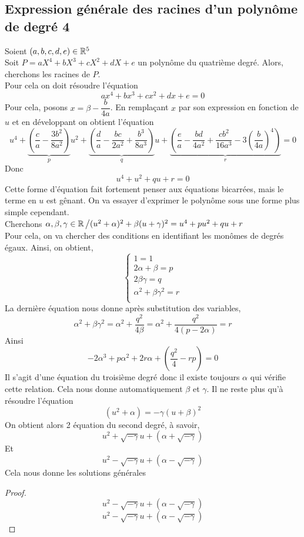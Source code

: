 \documentclass[mathmodern,openany,11pt]{livre}
\begin{document}
\subsection{Expression générale des racines d'un polynôme de degré 4}
Soient $(a,b,c,d,e)\in\mathbb{R}^5$\\
Soit $P = aX^4+bX^3+cX^2+dX+e$ un polynôme du quatrième degré. Alors, cherchons les racines de $P$.\\ 
Pour cela on doit résoudre l'équation 
\[ax^4+bx^3+cx^2+dx+e=0\]
Pour cela, posons $x = \beta - \dfrac{b}{4a}$. En remplaçant $x$ par son expression en fonction de $u$ et en développant on obtient l'équation
\[
u^4+\underbrace{\left(\dfrac{c}{a}-\dfrac{3b^2}{8a^2}\right)}_{p}u^2 + \underbrace{\left(\dfrac{d}{a}-\dfrac{bc}{2a^2}+\dfrac{b^3}{8a^3}\right)}_{q}u + \underbrace{\left(\dfrac{e}{a}-\dfrac{bd}{4a^2}+\dfrac{c b^2}{16a^3}-3\left(\dfrac{b}{4a}\right)^4\right)}_{r}= 0
\]
Donc 
\[
u^4+u^2+qu+r=0
\]
Cette forme d'équation fait fortement penser aux équations bicarrées, mais le terme en $u$ est gênant. On va essayer d'exprimer le polynôme sous une forme plus simple cependant.\\
Cherchons $\alpha, \beta, \gamma \in \mathbb{R} \left/(u^2+\alpha)^2+\beta (u+\gamma)^2=u^4+pu^2+qu+r\right.$\\
Pour cela, on va chercher des conditions en identifiant les monômes de degrés égaux. Ainsi, on obtient, 
\[
\left\{\begin{array}{l}
1=1\\
2\alpha+\beta = p\\
2 \beta \gamma = q\\
\alpha^2+\beta \gamma^2 = r\\
\end{array}\right.
\] 
La dernière équation nous donne après substitution des variables,
\[
\alpha^2+\beta \gamma^2=\alpha^2 + \dfrac{q^2}{4\beta}=\alpha^2 + \dfrac{q^2}{4(p-2\alpha)}=r
\]
Ainsi 
\[
-2\alpha^3+p\alpha^2+2r\alpha+\left(\dfrac{q^2}{4}-rp\right)=0
\]
Il s'agit d'une équation du troisième degré donc il existe toujours $\alpha$ qui vérifie cette relation. Cela nous donne automatiquement $\beta$ et $\gamma$. Il ne reste plus qu'à résoudre l'équation 
\[
(u^2+\alpha)=-\gamma(u+\beta)^2
\]
On obtient alors 2 équation du second degré, à savoir,
\[
u^2 + \sqrt{-\gamma}u + \left(\alpha + \sqrt{-\gamma}\right)
\]
Et
\[
u^2 - \sqrt{-\gamma}u + \left(\alpha - \sqrt{-\gamma}\right)
\]
Cela nous donne les solutions générales
\begin{proof}
\begin{equation}
u^2 - \sqrt{-\gamma}u + \left(\alpha - \sqrt{-\gamma}\right)
\end{equation}
\begin{equation}
u^2 - \sqrt{-\gamma}u + \left(\alpha - \sqrt{-\gamma}\right)
\end{equation}
\end{proof}
\end{document}
